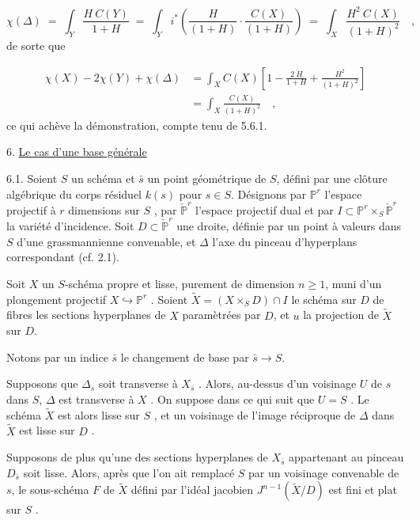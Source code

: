 \begin{equation}\tag{5.7.6}
\chi(\Delta) \;=\; \int_Y \frac{H\ C(Y)}{1 + H} \;=\; \int_Y i^{*} \left( \frac{H}{(1+H)} \cdot \frac{C(X)}{(1+H)} \right) \;=\; \int_X \frac{H^2\ C(X)}{(1+H)^2} \quad ,
\end{equation}
de sorte que

\begin{equation*}
\begin{aligned} \chi(X) - 2\chi(Y)+\chi(\Delta) &= \int_X C(X) \left[ 1 - \frac{2\ H}{1+H} + \frac{H^2}{(1+H)^2} \right] \\ &= \int_X \frac{C(X)}{(1 + H)^2} \quad , \end{aligned}
\end{equation*}
ce qui achève la démonstration, compte tenu de 5.6.1.




6. \underline{Le cas d'une base générale}

6.1. Soient $S$ un schéma et $\bar{s}$ un point géométrique de $S$, défini par une clôture algébrique du corps résiduel $k(s)$ pour $s \in S$. Désignons par $\mathbb{P}^r$ l'espace projectif à $r$ dimensions sur $S$ , par $\check{\mathbb{P}}^r$ l'espace projectif dual et par $I \subset \mathbb{P}^r \times_S \check{\mathbb{P}}^r$ la variété d'incidence. Soit $D \subset \check{\mathbb{P}}^r$ une droite, définie par un point à valeurs dans $S$ d'une grassmannienne convenable, et $\Delta$ l'axe du pinceau d'hyperplans correspondant (cf. 2.1).

Soit $X$ un $S$-schéma propre et lisse, purement de dimension $n \geq 1$, muni d'un plongement projectif $X \hookrightarrow \mathbb{P}^r$ . Soient $\widetilde{X} = (X \times_S D) \cap I$ le schéma sur $D$ de fibres les sections hyperplanes de $X$ paramètrées par $D$, et $u$ la projection de $\widetilde{X}$ sur $D$.

Notons par un indice $\bar{s}$ le changement de base par $\bar{s} \longrightarrow S$.

Supposons que $\Delta_{\bar{s}}$ soit transverse à $X_{\bar{s}}$ . Alors, au-dessus d'un voisinage $U$ de $s$ dans $S$, $\Delta$ est transverse à $X$ . On suppose dans ce qui suit que $U = S$ . Le schéma $\widetilde{X}$ est alors lisse sur $S$ , et un voisinage de l'image réciproque de $\Delta$ dans $\widetilde{X}$ est lisse sur $D$ .

Supposons de plus qu'une des sections hyperplanes de $X_{\bar{s}}$ appartenant au pinceau $D_{\bar{s}}$ soit lisse. Alors, après que l'on ait remplacé $S$ par un voisinage convenable de $s$, le sous-schéma $F$ de $\widetilde{X}$ défini par l'idéal jacobien $J^{n-1}(\widetilde{X}/D)$ est fini et plat sur $S$ .


